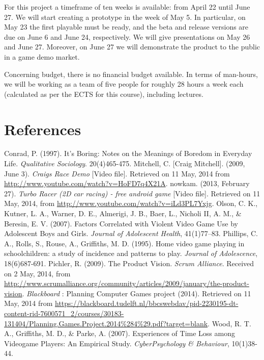 \documentclass[11pt,twoside,a4paper]{article}
\begin{document}
For this project a timeframe of ten weeks is available: from April 22 until June 27. We will start creating a prototype in the week of May 5. In particular, on May 23 the first playable must be ready, and the beta and release versions are due on June 6 and June 24, respectively. We will give presentations on May 26 and June 27. Moreover, on June 27 we will demonstrate the product to the public in a game demo market.

Concerning budget, there is no financial budget available. In terms of man-hours, we will be working as a team of five people for roughly 28 hours a week each (calculated as per the ECTS for this course), including lectures.


\clearpage

\section*{References}

Conrad, P. (1997). It's Boring: Notes on the Meanings of Boredom in Everyday Life. \textit{Qualitative Sociology}. 20(4)465-475.
\newline \newline
Mitchell, C. [Craig Mitchell]. (2009, June 3). \textit{Craigs Race Demo} [Video file]. Retrieved on 11 May, 2014 from \url{http://www.youtube.com/watch?v=HoFD7q4X21A}.
\newline \newline
nowkam. (2013, February 27). \textit{Turbo Racer (2D car racing) - free android game} [Video file]. Retrieved on 11 May, 2014, from \url{http://www.youtube.com/watch?v=iLd3PL7Yxjg}.
\newline \newline
Olson, C. K., Kutner, L. A., Warner, D. E., Almerigi, J. B., Baer, L., Nicholi II, A. M., \& Beresin, E. V. (2007). Factors Correlated with Violent Video Game Use by Adolescent Boys and Girls. \textit{Journal of Adolescent Health}, 41(1)77–83.
\newline \newline
Phillips, C. A., Rolls, S., Rouse, A., Griffiths, M. D. (1995). Home video game playing in schoolchildren: a study of incidence and patterns to play. \textit{Journal of Adolescence}, 18(6)687-691.
\newline \newline
Pichler, R. (2009). The Product Vision. \textit{Scrum Alliance}. Received on 2 May, 2014, from \url{http://www.scrumalliance.org/community/articles/2009/january/the-product-vision}.
\newline \newline
\textit{Blackboard} : Planning Computer Games project (2014). Retrieved on 11 May, 2014 from \url{https://blackboard.tudelft.nl/bbcswebdav/pid-2230195-dt-content-rid-7600571_2/courses/30183-131404/Planning.Games.Project.2014%284%29.pdf?target=blank}.
\newline \newline
Wood, R. T. A., Griffiths, M. D., \& Parke, A. (2007). Experiences of Time Loss among Videogame Players: An Empirical Study. \textit{CyberPsychology \& Behaviour}, 10(1)38-44.
\end{document}
